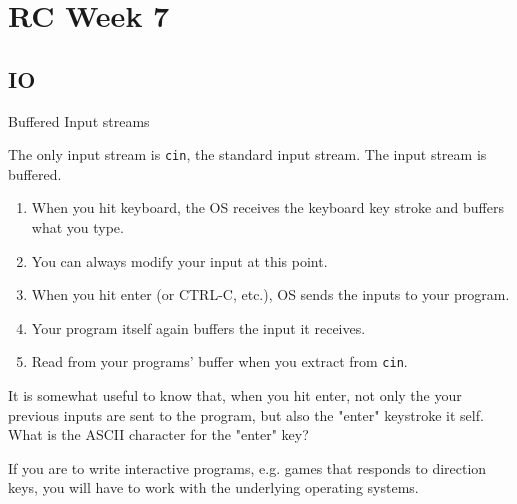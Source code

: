 \section{RC Week 7}

\subsection{IO}
\begin{frame}[fragile]{Buffered Input streams}

The only input stream is \texttt{cin}, the standard input stream. The input stream is buffered.

\begin{enumerate}
	\item When you hit keyboard, the OS receives the keyboard key stroke and buffers what you type. \item You can always modify your input at this point.
	\item When you hit enter (or CTRL-C, etc.), OS sends the inputs to your program.
	\item Your program itself again buffers the input it receives.
	\item Read from your programs' buffer when you extract from \texttt{cin}.
\end{enumerate}	


It is somewhat useful to know that, when you hit enter, not only the your previous inputs are sent to the program, but also the "enter" keystroke it self. What is the ASCII character for the "enter" key?

If you are to write interactive programs, e.g. games that responds to direction keys, you will have to work with the underlying operating systems. 

\end{frame}

